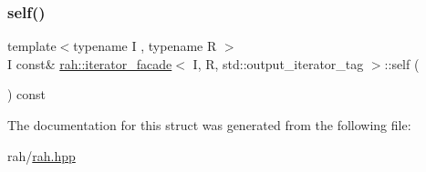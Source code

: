 \subsubsection{\texorpdfstring{self()}{self()}\hspace{0.1cm}{\footnotesize\ttfamily [2/2]}}
{\footnotesize\ttfamily template$<$typename I , typename R $>$ \\
I const\& \mbox{\hyperlink{structrah_1_1iterator__facade}{rah\+::iterator\+\_\+facade}}$<$ I, R, std\+::output\+\_\+iterator\+\_\+tag $>$\+::self (\begin{DoxyParamCaption}{ }\end{DoxyParamCaption}) const\hspace{0.3cm}{\ttfamily [inline]}}



The documentation for this struct was generated from the following file\+:\begin{DoxyCompactItemize}
\item 
rah/\mbox{\hyperlink{rah_8hpp}{rah.\+hpp}}\end{DoxyCompactItemize}

